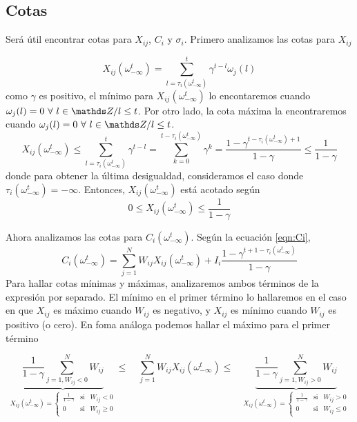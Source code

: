 \subsection{Cotas}
Será útil encontrar cotas para $X_{ij}$, $C_i$ y $\sigma_i$. Primero analizamos las cotas para $X_{ij}$

\begin{equation*}
    X_{ij}(\omega_{-\infty}^t) = \sum_{l=\tau_i(\omega_{-\infty}^t)}^t \gamma^{t-l} \omega_j(l)
\end{equation*}  
como $\gamma$ es positivo, el mínimo para $X_{ij}(\omega_{-\infty}^t)$ lo encontaremos cuando $\omega_j(l)=0 \ \forall \ l \in \enteros / l \leq t$. Por otro lado, la cota máxima la encontraremos cuando $\omega_j(l)=0 \ \forall \ l \in \enteros / l \leq t$.
\begin{equation*}
    X_{ij}(\omega_{-\infty}^t) \leq 
    \sum_{l=\tau_i(\omega_{-\infty}^t)}^t \gamma^{t-l} =
    \sum_{k=0}^{t-\tau_i(\omega_{-\infty}^t)} \gamma^{k} =
    \frac{1-\gamma^{t-\tau_i(\omega_{-\infty}^t)+1}}{1-\gamma} \leq
    \frac{1}{1-\gamma}
\end{equation*}  
donde para obtener la última desigualdad, consideramos el caso donde $\tau_i(\omega_{-\infty}^t) = -\infty$.
Entonces, $X_{ij}(\omega_{-\infty}^t)$ está acotado según
\begin{equation}
    0 \leq X_{ij}(\omega_{-\infty}^t) \leq 
    \frac{1}{1-\gamma}
    \label{eqn:cotaXij}
\end{equation}

Ahora analizamos las cotas para $C_i(\omega_{-\infty}^t)$. Según la ecuación \eqref{eqn:Ci}, 
\begin{equation}
     C_i(\omega_{-\infty}^t) = \sum_{j=1}^N W_{ij} X_{ij}(\omega_{-\infty}^t) + I_i \frac{1-\gamma^{t+1-\tau_i(\omega_{-\infty}^t) }}{1-\gamma}
\end{equation}
Para hallar cotas mínimas y máximas, analizaremos ambos términos de la expresión por separado. El mínimo en el primer término lo hallaremos en el caso en que $X_{ij}$ es máximo cuando $W_{ij}$ es negativo, y $X_{ij}$ es mínimo cuando $W_{ij}$ es positivo (o cero). En foma análoga podemos hallar el máximo para el primer término

\begin{equation}
     \underbrace{\frac{1}{1-\gamma}\sum_{j=1, W_{ij}<0}^N W_{ij}}_{X_{ij}(\omega_{-\infty}^t) = \left\{ \begin{array}{ccc}
         \frac{1}{1-\gamma} & \text{si} & W_{ij} < 0 \\
         0 & \text{si} & W_{ij} \geq 0
     \end{array} \right.} \leq \quad \sum_{j=1}^N W_{ij} X_{ij}(\omega_{-\infty}^t) \leq \quad \underbrace{\frac{1}{1-\gamma}\sum_{j=1, W_{ij}>0}^N W_{ij}}_{X_{ij}(\omega_{-\infty}^t) = \left\{ \begin{array}{ccc}
         \frac{1}{1-\gamma} & \text{si} & W_{ij} > 0 \\
         0 & \text{si} & W_{ij} \leq 0
     \end{array} \right.}
\end{equation}



